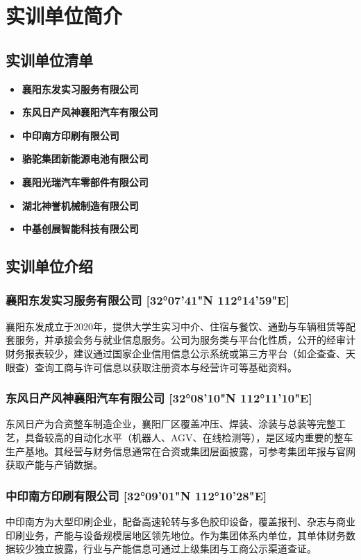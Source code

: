 \section{实训单位简介}
\subsection{实训单位清单}
\begin{itemize}
    \item \textbf{襄阳东发实习服务有限公司}
    \item \textbf{东风日产风神襄阳汽车有限公司}
    \item \textbf{中印南方印刷有限公司}
    \item \textbf{骆驼集团新能源电池有限公司}
    \item \textbf{襄阳光瑞汽车零部件有限公司}
    \item \textbf{湖北神誉机械制造有限公司}
    \item \textbf{中基创展智能科技有限公司}
\end{itemize}

\subsection{实训单位介绍}

\subsubsection*{襄阳东发实习服务有限公司 [32°07'41"N 112°14'59"E]}
襄阳东发成立于2020年，提供大学生实习中介、住宿与餐饮、通勤与车辆租赁等配套服务，并承接会务与就业信息服务。公司为服务类与平台化性质，公开的经审计财务报表较少，建议通过国家企业信用信息公示系统或第三方平台（如企查查、天眼查）查询工商与许可信息以获取注册资本与经营许可等基础资料。

\subsubsection*{东风日产风神襄阳汽车有限公司 [32°08'10"N 112°11'10"E]}
东风日产为合资整车制造企业，襄阳厂区覆盖冲压、焊装、涂装与总装等完整工艺，具备较高的自动化水平（机器人、AGV、在线检测等），是区域内重要的整车生产基地。其经营与财务信息通常在合资或集团层面披露，可参考集团年报与官网获取产能与产销数据。

\subsubsection*{中印南方印刷有限公司 [32°09'01"N 112°10'28"E]}
中印南方为大型印刷企业，配备高速轮转与多色胶印设备，覆盖报刊、杂志与商业印刷业务，产能与设备规模居地区领先地位。作为集团体系内单位，其单体财务数据较少独立披露，行业与产能信息可通过上级集团与工商公示渠道查证。


